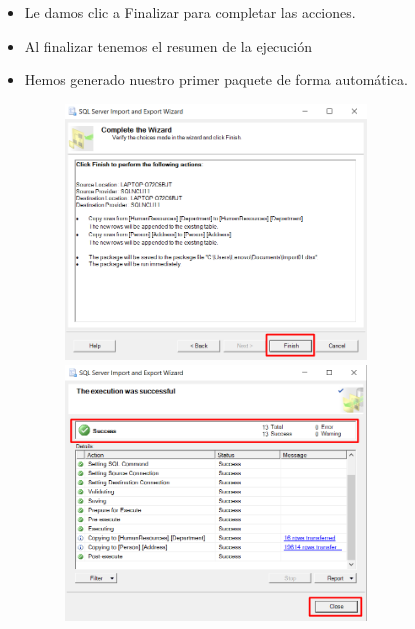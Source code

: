 \documentclass{article}
\begin{document}
\begin{itemize}
\item Le damos clic a Finalizar para completar las acciones.
\item Al finalizar tenemos el resumen de la ejecución
\item Hemos generado nuestro primer paquete de forma automática.
	\begin{figure}[htb]
		\begin{center}
			\includegraphics[width=8cm]{./images/Tarea1_9}
			\includegraphics[width=8cm]{./images/Tarea1_10}
		\end{center}
	\end{figure}

\newpage


\end{itemize}
\end{document}
